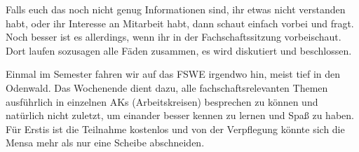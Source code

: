 

Falls euch das noch nicht genug Informationen sind, ihr etwas nicht verstanden habt, oder ihr Interesse an Mitarbeit habt, dann schaut einfach vorbei und fragt. Noch besser ist es allerdings, wenn ihr in der Fachschaftssitzung vorbeischaut. Dort laufen sozusagen alle Fäden zusammen, es wird diskutiert und beschlossen.

Einmal im Semester fahren wir auf das \gls{FSWE} irgendwo hin, meist tief in den Odenwald. Das Wochenende dient dazu, alle fachschaftsrelevanten Themen ausführlich in einzelnen AKs (Arbeitskreisen) besprechen zu können und natürlich nicht zuletzt, um einander besser kennen zu lernen und Spaß zu haben. Für Erstis ist die Teilnahme kostenlos und von der Verpflegung könnte sich die Mensa mehr als nur eine Scheibe abschneiden.
